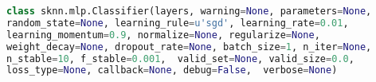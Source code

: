 \begin{lstlisting}[language=Python, caption={Sknn classifier specification \citep{misc:sknn}}, label=code:sknn_net]
class sknn.mlp.Classifier(layers, warning=None, parameters=None, 
random_state=None, learning_rule=u'sgd', learning_rate=0.01, 
learning_momentum=0.9, normalize=None, regularize=None, 
weight_decay=None, dropout_rate=None, batch_size=1, n_iter=None, 
n_stable=10, f_stable=0.001,  valid_set=None, valid_size=0.0, 
loss_type=None, callback=None, debug=False,  verbose=None)
\end{lstlisting}